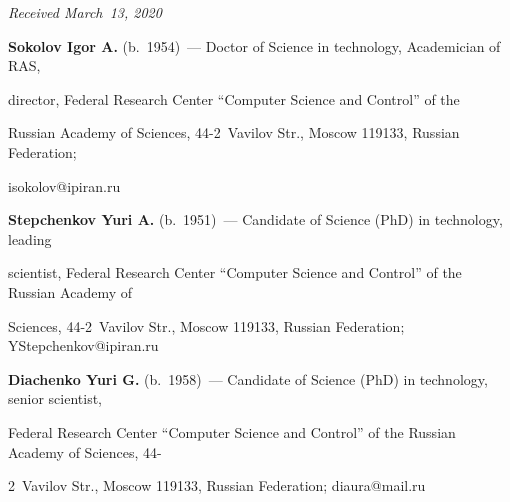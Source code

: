 \vspace*{-3pt}



  \hfill{\small\textit{Received March~13, 2020}}








\vspace*{-18pt}

  

  

  \Contr

  

  \vspace*{-2pt}

  

  \noindent

  \textbf{Sokolov Igor A.} (b.\ 1954)~--- Doctor of Science in technology, Academician of RAS, 

  director, Federal Research Center ``Computer Science and Control'' of the 

Russian Academy of Sciences, 44-2~Vavilov Str., Moscow 119133, Russian Federation; 

\mbox{isokolov@ipiran.ru}

  

  \vspace*{3pt}

  

  \noindent

  \textbf{Stepchenkov Yuri A.} (b.\ 1951)~--- Candidate of Science (PhD) in technology, leading 

scientist, Federal Research Center ``Computer Science and Control'' of the Russian Academy of 

Sciences, 44-2~Vavilov Str., Moscow 119133, Russian Federation; \mbox{YStepchenkov@ipiran.ru}

  

  \vspace*{3pt}

  

  \noindent

  \textbf{Diachenko Yuri G.} (b.\ 1958)~--- Candidate of Science (PhD) in technology, senior scientist, 

Federal Research Center ``Computer Science and Control'' of the Russian Academy of Sciences, 44-

2~Vavilov Str., Moscow 119133, Russian Federation; \mbox{diaura@mail.ru}

